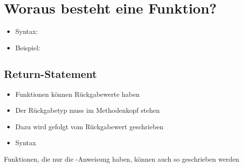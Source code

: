 
\subtitle{Kapitel 6: wie Funktionen funktionieren}


\section{Woraus besteht eine Funktion?}
\begin{frame}[c]
    \slidehead
    \begin{itemize}[<+->]
        \item Syntax: 
        \item Beispiel: 
    \end{itemize}
\end{frame}

\subsection{Return-Statement}
\begin{frame}
    \slidehead
    \begin{itemize}
        \item Funktionen können Rückgabewerte haben
        \item Der Rückgabetyp muss im Methodenkopf stehen
        \item Dazu wird  gefolgt vom Rückgabewert geschrieben
            \pause
        \item Syntax 
    \end{itemize}
\end{frame}

\begin{frame}
    \slidehead
    \pause
    Funktionen, die nur die -Anweisung haben, können auch so geschrieben werden
\end{frame}

